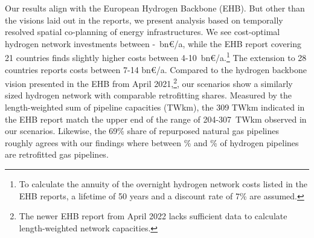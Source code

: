 Our results align with the European Hydrogen Backbone
(EHB).\cite{gasforclimateEuropeanHydrogen2020,gasforclimateExtendingEuropean2021,gasforclimateEuropeanHydrogen2021,gasforclimateEuropeanHydrogen2022}
But other than the visions laid out in the reports, we present analysis based on
temporally resolved spatial co-planning of energy infrastructures. We see
cost-optimal hydrogen network investments between
\minhycost-\maxhycost~bn\euro/a, while the EHB report covering 21 countries
finds slightly higher costs between
4-10~bn\euro/a.\cite{gasforclimateExtendingEuropean2021}\footnote{To calculate
the annuity of the overnight hydrogen network costs listed in the EHB reports, a
lifetime of 50 years and a discount rate of 7\% are assumed.} The extension to
28 countries reports costs between 7-14
bn\euro/a.\cite{gasforclimateEuropeanHydrogen2022} Compared to the hydrogen
backbone vision presented in the EHB from April
2021,\cite{gasforclimateExtendingEuropean2021}\footnote{The newer EHB report
from April 2022 \cite{gasforclimateEuropeanHydrogen2022} lacks sufficient data
to calculate length-weighted network capacities.}, our scenarios show a
similarly sized hydrogen network with comparable retrofitting shares. Measured
by the length-weighted sum of pipeline capacities (TWkm), the 309 TWkm indicated
in the EHB report match the upper end of the range of
204-307~TWkm observed in our scenarios. Likewise, the
69\% share of repurposed natural gas pipelines
\cite{gasforclimateExtendingEuropean2021} roughly agrees with our findings where between
\minretroshare\% and \maxretroshare\% of hydrogen pipelines are retrofitted gas
pipelines.




